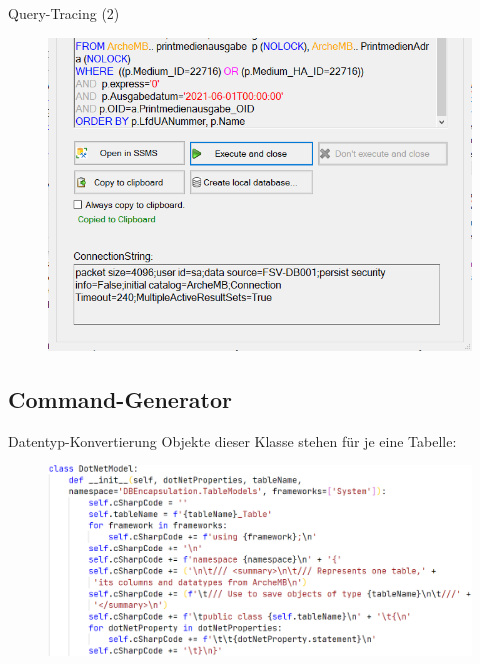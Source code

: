 \documentclass[toc]{beamer}
\begin{document}
        \begin{frame}{Query-Tracing (2)}
            \begin{figure}[htp]
                \includegraphics[scale=0.4]{gui_crop.png}
            \end{figure}
        \end{frame}
        
    \subsection{Command-Generator}
        \begin{frame}{Datentyp-Konvertierung}
        Objekte dieser Klasse stehen für je eine Tabelle:
            \begin{figure}[htp]
                \includegraphics[scale=0.36]{dotNetModel.PNG}
            \end{figure}
        \end{frame}
        
\end{document}
